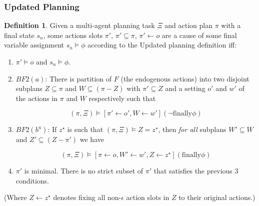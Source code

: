 \documentclass{article}
\theoremstyle{plain}
\theoremstyle{definition}
\newtheorem{defn}[thm]{Definition} %
\begin{document}
\subsubsection*{Updated Planning}\label{sec:updatedPlanning}
\begin{defn}
Given a multi-agent planning task $\Xi$ and action plan $\pi$ with a final state $s_n$, some actions slots $\pi'$, $\pi' \subseteq \pi$, $\pi' \leftarrow o$ are a cause of some final variable assignment $s_n \models \phi$ according to the Updated planning definition iff:
\begin{enumerate}
\item  $\pi' \models o$ and $s_n \models \phi$.



\item $BF2(a)$: There is partition of $F$ (the endogenous actions) into two disjoint subplans $Z \subseteq \pi$ and $W \subseteq (\pi - Z)$ with $\pi' \subseteq Z$ and a setting $o'$ and $w'$ of the actions in $\pi$ and $W$ respectively such that

\[
(\pi, \Xi) \models [\pi' \leftarrow o', W \leftarrow w'](\lnot \textrm{finally} \phi)
\]

\item $BF2(b^u)$: If $z^\star$ is such that $(\pi, \Xi) \models Z = z^\star$, then \textit{for all} subplans $W' \subseteq W$ and $Z' \subseteq (Z - \pi')$ we have

\[
(\pi, \Xi) \models [\pi \leftarrow o, W' \leftarrow w', Z \leftarrow z^\star](\textrm{finally} \phi)
\]

\item $\pi'$ is minimal. There is no strict subset of $\pi'$ that satisfies the previous 3 conditions.
\end{enumerate}
\end{defn}

(Where $Z\leftarrow z^\star$ denotes fixing all non-$\epsilon$ action slots in $Z$ to their original actions.)
\end{document}
